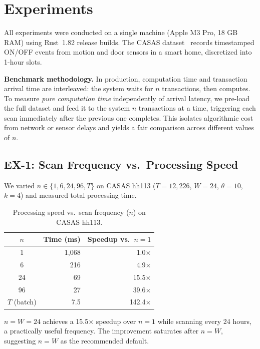 \section{Experiments}

All experiments were conducted on a single machine
(Apple M3 Pro, 18 GB RAM) using Rust~1.82 release builds.
The CASAS dataset~\cite{casas2013} records timestamped ON/OFF events
from motion and door sensors in a smart home,
discretized into 1-hour slots.

\textbf{Benchmark methodology.}
In production, computation time and transaction arrival time are
interleaved: the system waits for $n$ transactions, then computes.
To measure \textit{pure computation time} independently of arrival
latency, we pre-load the full dataset and feed it to the system
$n$ transactions at a time, triggering each scan immediately after
the previous one completes.
This isolates algorithmic cost from network or sensor delays and
yields a fair comparison across different values of $n$.

\subsection{EX-1: Scan Frequency vs.\ Processing Speed}

We varied $n \in \{1, 6, 24, 96, T\}$ on CASAS hh113
($T = 12{,}226$, $W = 24$, $\theta = 10$, $k = 4$)
and measured total processing time.

\begin{table}[t]
\caption{Processing speed vs.\ scan frequency ($n$) on CASAS hh113.}
\begin{center}
\begin{tabular}{|c|r|r|}
\hline
$n$ & Time (ms) & Speedup vs.\ $n{=}1$ \\\hline
1   & 1,068     & 1.0$\times$ \\
6   &   216     & 4.9$\times$ \\
24  &    69     & 15.5$\times$ \\
96  &    27     & 39.6$\times$ \\
$T$ (batch) & 7.5 & 142.4$\times$ \\\hline
\end{tabular}
\end{center}
\end{table}

$n = W = 24$ achieves a 15.5$\times$ speedup over $n = 1$
while scanning every 24 hours, a practically useful frequency.
The improvement saturates after $n = W$,
suggesting $n = W$ as the recommended default.

